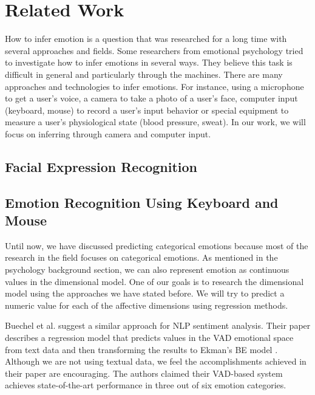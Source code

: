 \documentclass{article}
\begin{document}
\section{Related Work}
How to infer emotion is a question that was researched for a long time with several approaches and fields.
Some researchers from emotional psychology tried to investigate how to infer emotions in several ways.
They believe this task is difficult in general and particularly through the machines. There are many approaches and technologies to infer emotions.
For instance, using a microphone to get a user’s voice, a camera to take a photo of a user’s face, computer input (keyboard, mouse) to record a user’s
input behavior or special equipment to measure a user’s physiological state (blood pressure, sweat).
In our work, we will focus on inferring through camera and computer input.

\subsection{Facial Expression Recognition} \label{section:fer}


\subsection{Emotion Recognition Using Keyboard and Mouse} \label{section:keyboard_mouse}


Until now, we have discussed predicting categorical emotions because most of the research in the 
field focuses on categorical emotions. As mentioned in the psychology background section, 
we can also represent emotion as continuous values in the dimensional model. 
One of our goals is to research the dimensional model using the approaches we have stated before. 
We will try to predict a numeric value for each of the affective dimensions using 
regression methods.
\par

Buechel et al. \cite{emotion_regression} suggest a similar approach for NLP sentiment analysis. 
Their paper describes a regression model that predicts values in the VAD emotional 
space \cite{VAD_model} from text data and then transforming the results to Ekman's BE model \cite{Ekman_Theory}. 
Although we are not using textual data, we feel the accomplishments achieved in their 
paper are encouraging. The authors claimed their VAD-based system achieves state-of-the-art 
performance in three out of six emotion categories.
\par
\end{document}
